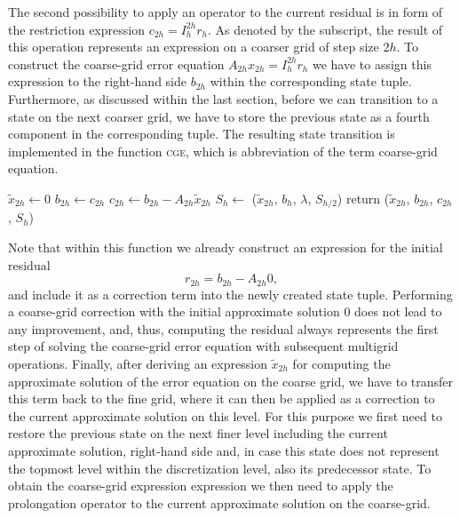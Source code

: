 The second possibility to apply an operator to the current residual is in form of the restriction expression $c_{2h} = I_{h}^{2h} r_h$.
As denoted by the subscript, the result of this operation represents an expression on a coarser grid of step size $2h$.
To construct the coarse-grid error equation $A_{2h} x_{2h} = I_{h}^{2h} r_h$ we have to assign this expression to the right-hand side $b_{2h}$ within the corresponding state tuple.
Furthermore, as discussed within the last section, before we can transition to a state on the next coarser grid, we have to store the previous state as a fourth component in the corresponding tuple.
The resulting state transition is implemented in the function \textsc{cge}, which is abbreviation of the term coarse-grid equation.
\begin{algorithm}
	\begin{algorithmic}
		\State $\tilde{x}_{2h} \gets 0$ 
		\State $b_{2h} \gets c_{2h}$
		\State $c_{2h} \gets b_{2h} - A_{2h} \tilde{x}_{2h}$ 
		\State $S_h \gets$ ($\tilde{x}_{2h}$, $b_{h}$, $\lambda$, $S_{h/2}$)
		\State return ($\tilde{x}_{2h}$, $b_{2h}$, $c_{2h}$, $S_h$)
		\EndFunction
	\end{algorithmic}
\end{algorithm}
Note that within this function we already construct an expression for the initial residual
\begin{equation}
	r_{2h} = b_{2h} - A_{2h} 0,
\end{equation} 
and include it as a correction term into the newly created state tuple.
Performing a coarse-grid correction with the initial approximate solution $0$ does not lead to any improvement, and, thus, computing the residual always represents the first step of solving the coarse-grid error equation with subsequent multigrid operations.
Finally, after deriving an expression $\tilde{x}_{2h}$ for computing the approximate solution of the error equation on the coarse grid, we have to transfer this term back to the fine grid, where it can then be applied as a correction to the current approximate solution on this level.
For this purpose we first need to restore the previous state on the next finer level including the current approximate solution, right-hand side and, in case this state does not represent the topmost level within the discretization level, also its predecessor state.
To obtain the coarse-grid expression expression we then need to apply the prolongation operator to the current approximate solution on the coarse-grid.
